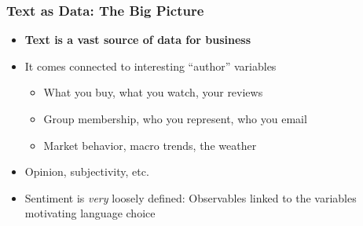 \documentclass[
  shownotes,
  xcolor={svgnames},
  hyperref={colorlinks,citecolor=DarkBlue,linkcolor=DarkRed,urlcolor=DarkBlue}
  , aspectratio=169]{beamer}
\newcommand{\theme}{\color{andesred}}
\newcommand{\gr}{\color{black!60}}
\begin{document}

\begin{frame}[fragile]
\frametitle{Text as Data: The Big Picture}

\begin{itemize}


\item {\bf \theme Text is a vast source of data for business }
\medskip
\item It comes connected to interesting ``author'' variables 
\medskip
  \begin{itemize}
  \item What you buy, what you watch, your reviews
  \medskip
  \item Group membership, who you represent, who you email
  \medskip
  \item Market behavior, macro trends, the weather
  \end{itemize}

 
\item Opinion, subjectivity, etc.
\medskip
\item  Sentiment is {\it very} loosely defined:  Observables linked to the variables motivating language choice
\end{itemize}

\end{frame}
\end{document}

